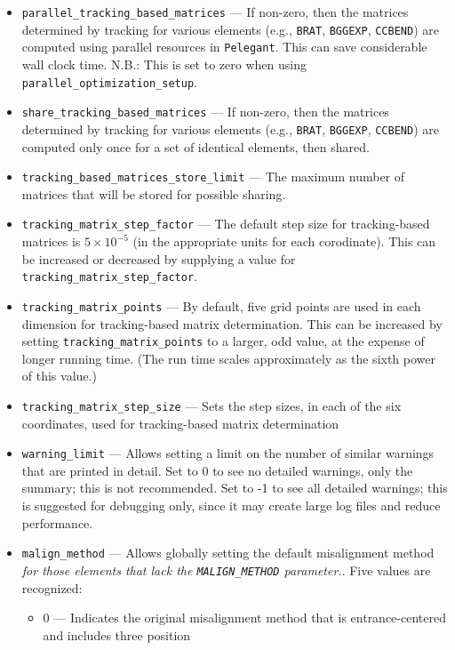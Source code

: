 \documentclass[11pt]{article}
\begin{document}
\begin{itemize}
  A value of 100 is suggested as a starting point, but this will be highly system-dependent.
\item \verb|parallel_tracking_based_matrices| --- If non-zero, then the matrices determined by tracking for various elements
  (e.g., \verb|BRAT|, \verb|BGGEXP|, \verb|CCBEND|) are computed using parallel resources in \verb|Pelegant|. 
  This can save considerable wall clock time.
  N.B.: This is set to zero when using \verb|parallel_optimization_setup|.
\item \verb|share_tracking_based_matrices| --- If non-zero, then the matrices determined by tracking for various elements
  (e.g., \verb|BRAT|, \verb|BGGEXP|, \verb|CCBEND|) are computed only once for a set of identical elements, then shared.
\item \verb|tracking_based_matrices_store_limit| ---  The maximum number of matrices that will be stored for possible sharing.
\item \verb|tracking_matrix_step_factor| --- The default step size for tracking-based matrices is $5 \times 10^{-5}$ 
  (in the appropriate units for each corodinate). This can be increased or decreased by supplying a value for 
  \verb|tracking_matrix_step_factor|.
\item \verb|tracking_matrix_points| --- By default, five grid points are used in each dimension for tracking-based matrix determination.
  This can be increased by setting \verb|tracking_matrix_points| to a larger, odd value, at the expense of longer running time.
  (The run time scales approximately as the sixth power of this value.)
\item \verb|tracking_matrix_step_size| --- Sets the step sizes, in each of the six coordinates,
  used for tracking-based matrix determination
\item \verb|warning_limit| --- Allows setting a limit on the number of similar warnings that are printed in detail.
  Set to 0 to see no detailed warnings, only the summary; this is not recommended.
  Set to -1 to see all detailed warnings; this is suggested for debugging only, since it may create large log files
  and reduce performance.
\item \verb|malign_method| --- Allows globally setting the default misalignment method {\em for those elements that
    lack the \verb|MALIGN_METHOD| parameter.}. Five values are recognized:
  \begin{itemize}
  \item 0 --- Indicates the original misalignment method that is entrance-centered and includes three position

\end{itemize}
\end{itemize}
\end{document}
